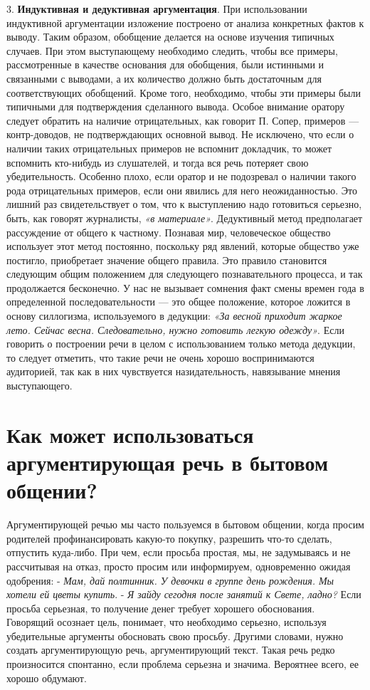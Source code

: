 3. \textbf{Индуктивная и дедуктивная аргументация}. При использовании индуктивной аргументации изложение построено от анализа конкретных фактов к выводу. Таким образом, обобщение делается на основе изучения типичных случаев. При этом выступающему необходимо следить, чтобы все примеры, рассмотренные в качестве основания для обобщения, были истинными и связанными с выводами, а их количество должно быть достаточным для соответствующих обобщений. Кроме того, необходимо, чтобы эти примеры были типичными для подтверждения сделанного вывода. Особое внимание оратору следует обратить на наличие отрицательных, как говорит П. Сопер, примеров — контр-доводов, не подтверждающих основной вывод. Не исключено, что если о наличии таких отрицательных примеров не вспомнит докладчик, то может вспомнить кто-нибудь из слушателей, и тогда вся речь потеряет свою убедительность. Особенно плохо, если оратор и не подозревал о наличии такого рода отрицательных примеров, если они явились для него неожиданностью. Это лишний раз свидетельствует о том, что к выступлению надо готовиться серьезно, быть, как говорят журналисты, \textit{«в материале»}. Дедуктивный метод предполагает рассуждение от общего к частному. Познавая мир, человеческое общество использует этот метод постоянно, поскольку ряд явлений, которые общество уже постигло, приобретает значение общего правила. Это правило становится следующим общим положением для следующего познавательного процесса, и так продолжается бесконечно. У нас не вызывает сомнения факт смены времен года в определенной последовательности — это общее положение, которое ложится в основу силлогизма, используемого в дедукции: \textit{«За весной приходит жаркое лето. Сейчас весна. Следовательно, нужно готовить легкую одежду»}. Если говорить о построении речи в целом с использованием только метода дедукции, то следует отметить, что такие речи не очень хорошо воспринимаются аудиторией, так как в них чувствуется назидательность, навязывание мнения выступающего.

\chapter{\textbf{Как может использоваться аргументирующая речь в бытовом общении?}}
Аргументирующей речью мы часто пользуемся в бытовом общении, когда просим родителей профинансировать какую-то покупку, разрешить что-то сделать, отпустить куда-либо. При чем, если просьба простая, мы, не задумываясь и не рассчитывая на отказ, просто просим или информируем, одновременно ожидая одобрения: 
- \textit{Мам, дай полтинник. У девочки в группе день рождения. Мы хотели ей цветы купить}. 
- \textit{Я зайду сегодня после занятий к Свете, ладно?}
Если просьба серьезная, то получение денег требует хорошего обоснования. Говорящий осознает цель, понимает, что необходимо серьезно, используя убедительные аргументы обосновать свою просьбу. Другими словами, нужно создать аргументирующую речь,
аргументирующий текст. Такая речь редко произносится спонтанно, если проблема серьезна и значима. Вероятнее всего, ее хорошо обдумают. 